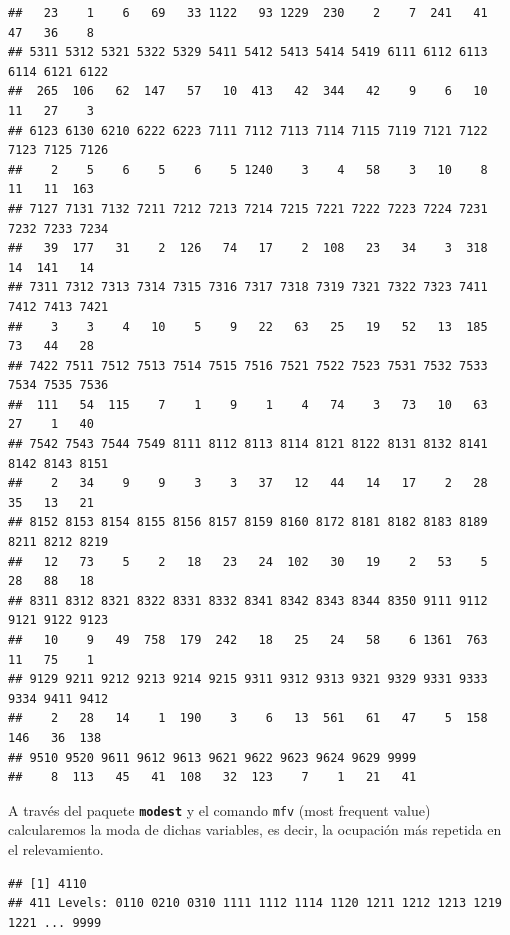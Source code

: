 \documentclass[
]{book}
\newenvironment{Shaded}{\begin{snugshade}}{\end{snugshade}}
\newcommand{\AttributeTok}[1]{\textcolor[rgb]{0.77,0.63,0.00}{#1}}
\newcommand{\ConstantTok}[1]{\textcolor[rgb]{0.00,0.00,0.00}{#1}}
\newcommand{\FunctionTok}[1]{\textcolor[rgb]{0.00,0.00,0.00}{#1}}
\newcommand{\NormalTok}[1]{#1}
\newcommand{\SpecialCharTok}[1]{\textcolor[rgb]{0.00,0.00,0.00}{#1}}
\begin{document}
\begin{verbatim}
##   23    1    6   69   33 1122   93 1229  230    2    7  241   41   47   36    8 
## 5311 5312 5321 5322 5329 5411 5412 5413 5414 5419 6111 6112 6113 6114 6121 6122 
##  265  106   62  147   57   10  413   42  344   42    9    6   10   11   27    3 
## 6123 6130 6210 6222 6223 7111 7112 7113 7114 7115 7119 7121 7122 7123 7125 7126 
##    2    5    6    5    6    5 1240    3    4   58    3   10    8   11   11  163 
## 7127 7131 7132 7211 7212 7213 7214 7215 7221 7222 7223 7224 7231 7232 7233 7234 
##   39  177   31    2  126   74   17    2  108   23   34    3  318   14  141   14 
## 7311 7312 7313 7314 7315 7316 7317 7318 7319 7321 7322 7323 7411 7412 7413 7421 
##    3    3    4   10    5    9   22   63   25   19   52   13  185   73   44   28 
## 7422 7511 7512 7513 7514 7515 7516 7521 7522 7523 7531 7532 7533 7534 7535 7536 
##  111   54  115    7    1    9    1    4   74    3   73   10   63   27    1   40 
## 7542 7543 7544 7549 8111 8112 8113 8114 8121 8122 8131 8132 8141 8142 8143 8151 
##    2   34    9    9    3    3   37   12   44   14   17    2   28   35   13   21 
## 8152 8153 8154 8155 8156 8157 8159 8160 8172 8181 8182 8183 8189 8211 8212 8219 
##   12   73    5    2   18   23   24  102   30   19    2   53    5   28   88   18 
## 8311 8312 8321 8322 8331 8332 8341 8342 8343 8344 8350 9111 9112 9121 9122 9123 
##   10    9   49  758  179  242   18   25   24   58    6 1361  763   11   75    1 
## 9129 9211 9212 9213 9214 9215 9311 9312 9313 9321 9329 9331 9333 9334 9411 9412 
##    2   28   14    1  190    3    6   13  561   61   47    5  158  146   36  138 
## 9510 9520 9611 9612 9613 9621 9622 9623 9624 9629 9999 
##    8  113   45   41  108   32  123    7    1   21   41
\end{verbatim}

A través del paquete \textbf{\texttt{modest}} y el comando \texttt{mfv} (most frequent value) calcularemos la moda de dichas variables, es decir, la ocupación más repetida en el relevamiento.

\begin{Shaded}
\end{Shaded}

\begin{verbatim}
## [1] 4110
## 411 Levels: 0110 0210 0310 1111 1112 1114 1120 1211 1212 1213 1219 1221 ... 9999
\end{verbatim}
\end{document}
